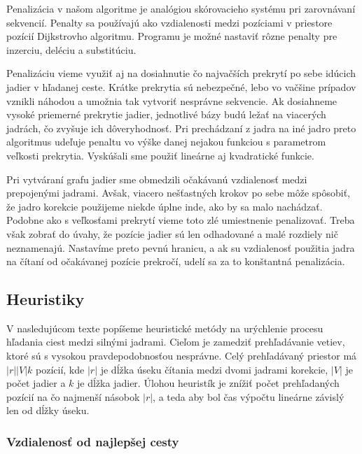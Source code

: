 Penalizácia v našom algoritme je analógiou skórovacieho systému pri zarovnávaní sekvencií. Penalty sa používajú ako vzdialenosti medzi pozíciami v priestore pozícií Dijkstrovho algoritmu. Programu je možné nastaviť rôzne penalty pre inzerciu, deléciu a substitúciu. %

Penalizáciu vieme využiť aj na dosiahnutie čo najvačších prekrytí po sebe idúcich jadier v hľadanej ceste. Krátke prekrytia sú nebezpečné, lebo vo vačšine prípadov vznikli náhodou a umožnia tak vytvoriť nesprávne sekvencie. Ak dosiahneme vysoké priemerné prekrytie jadier, jednotlivé bázy budú ležať na viacerých jadrách, čo zvyšuje ich dôveryhodnosť. Pri prechádzaní z jadra na iné jadro preto algoritmus udeľuje penaltu vo výške danej nejakou funkciou s parametrom veľkosti prekrytia. Vyskúšali sme použiť lineárne aj kvadratické funkcie.

Pri vytváraní grafu jadier sme obmedzili očakávanú vzdialenosť medzi prepojenými jadrami. Avšak, viacero nešťastných krokov po sebe môže spôsobiť, že jadro korekcie použijeme niekde úplne inde, ako by sa malo nachádzať. Podobne ako s veľkosťami prekrytí vieme toto zlé umiestnenie penalizovať. Treba však zobrať do úvahy, že pozície jadier sú len odhadované a malé rozdiely nič neznamenajú. Nastavíme preto pevnú hranicu, a ak su vzdialenosť použitia jadra na čítaní od očakávanej pozície prekročí, udelí sa za to konštantná penalizácia.

\subsection{Heuristiky}

V nasledujúcom texte popíšeme heuristické metódy na urýchlenie procesu hľadania ciest medzi silnými jadrami. Cieľom je zamedziť prehľadávanie vetiev, ktoré sú s vysokou pravdepodobnosťou nesprávne. Celý prehľadávaný priestor má $|r||V|k$ pozícií, kde $|r|$ je dĺžka úseku čítania medzi dvomi jadrami korekcie, $|V|$ je počet jadier a $k$ je dĺžka jadier. Úlohou heuristík je znížiť počet prehľadaných pozícií na čo najmenší násobok $|r|$, a teda aby bol čas výpočtu lineárne závislý len od dĺžky úseku.

\subsubsection{Vzdialenosť od najlepšej cesty}

